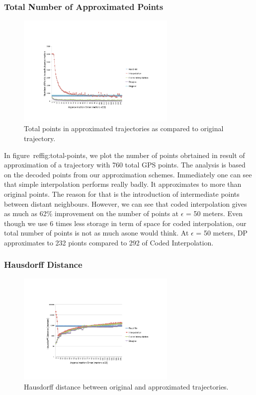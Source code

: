 \documentclass[conference]{IEEEtran}
\begin{document}
\subsubsection{Total Number of Approximated Points}
  \begin{figure}[h]
  \centering
  \includegraphics[width=3in]{images/total-points.pdf}
  \caption {Total points in approximated trajectories as compared to original trajectory.}
  \label{fig:total-points}
\end{figure}
In figure~ref{fig:total-points}, we plot the number of points obrtained in result of approximation of a trajectory with 760 total 
GPS points. The analysis is based on the decoded points from our approximation schemes. Immediately one can see that 
simple interpolation performs really badly. It approximates to more than original points. The reason for that is the introduction 
of intermediate points between distant neighbours. However, we can see that coded interpolation gives as much as 62\% 
improvement on the number of points at $\epsilon$ = 50 meters. Even though we use 6 times less storage in term of space 
for coded interpolation, our total number of points is not as much asone would think. At $\epsilon$ = 50 meters, DP approximates 
to 232 pionts compared to 292 of Coded Interpolation.

\subsubsection{Hausdorff Distance}
\begin{figure}[h]
  \centering
  \includegraphics[width=3in]{images/hausdorff-distance.pdf}
  \caption {Hausdorff distance between original and approximated trajectories.}
  \label{fig:hausdorff-distance}
  \end{figure}
  
\end{document}
